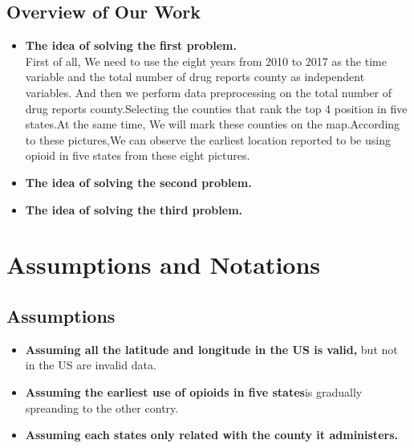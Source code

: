 \documentclass{mcmthesis}
\begin{document}
\subsection{Overview of Our Work} %
\begin{itemize}
\item \textbf{The idea of solving the first problem.} \\ %
First of all, We need to use the eight years from 2010 to 2017 as the time variable and the total number of drug reports county as independent variables. And then we perform data preprocessing on the total number of drug reports county.Selecting the counties that rank the  top 4 position in five states.At the same time, We will mark these counties on the map.According to these pictures,We can observe the earliest location reported to be using opioid in five states from these eight pictures.\\



\item  \textbf{The idea of solving the second problem.}\\%

\item  \textbf{The idea of solving the third problem.} \\%
\end{itemize}

\section{Assumptions and Notations}
\subsection{Assumptions}

\begin{itemize}
	\item \textbf {Assuming all the latitude and longitude in the US is valid,} but not in the US are invalid data. %
	\item \textbf{Assuming the earliest use of opioids in five states}is gradually spreanding to the other contry. %
	\item  \textbf{Assuming each states only related with the county it administers.} %
\end{itemize}
\end{document}
